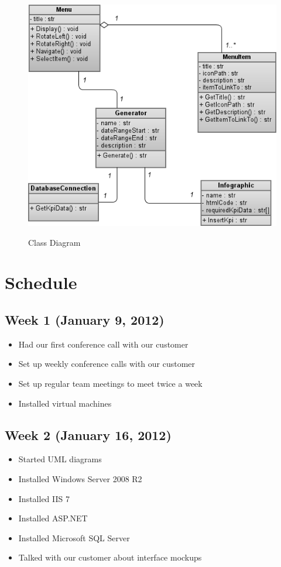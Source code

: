 \documentclass[11pt,a4paper,oneside]{article}
\begin{document}
\begin{figure}[!]
\caption{Class Diagram}
\includegraphics[width=1\textwidth]{images/Capstone_-_Class_Diagram.png}\\
\end{figure}


\section{Schedule}

\subsection{Week 1 (January 9, 2012)}
\begin{itemize}
\item Had our first conference call with our customer
\item Set up weekly conference calls with our customer
\item Set up regular team meetings to meet twice a week
\item Installed virtual machines
\end{itemize}


\subsection{Week 2 (January 16, 2012)}
\begin{itemize}
\item Started UML diagrams
\item Installed Windows Server 2008 R2
\item Installed IIS 7
\item Installed ASP.NET
\item Installed Microsoft SQL Server
\item Talked with our customer about interface mockups
\end{itemize}
\end{document}
